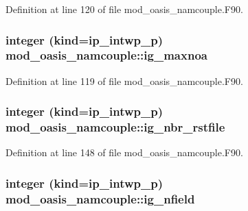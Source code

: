 Definition at line 120 of file mod\+\_\+oasis\+\_\+namcouple.\+F90.

\hypertarget{classmod__oasis__namcouple_ae66cf9f63b6c440406c9b675caef7759}{
\subsubsection[{ig\+\_\+maxnoa}]{\setlength{\rightskip}{0pt plus 5cm}integer (kind=ip\+\_\+intwp\+\_\+p) mod\+\_\+oasis\+\_\+namcouple\+::ig\+\_\+maxnoa\hspace{0.3cm}{\ttfamily [private]}}}\label{classmod__oasis__namcouple_ae66cf9f63b6c440406c9b675caef7759}


Definition at line 119 of file mod\+\_\+oasis\+\_\+namcouple.\+F90.

\hypertarget{classmod__oasis__namcouple_a05148b30ca97c536b40a896153c8921f}{
\subsubsection[{ig\+\_\+nbr\+\_\+rstfile}]{\setlength{\rightskip}{0pt plus 5cm}integer (kind=ip\+\_\+intwp\+\_\+p) mod\+\_\+oasis\+\_\+namcouple\+::ig\+\_\+nbr\+\_\+rstfile\hspace{0.3cm}{\ttfamily [private]}}}\label{classmod__oasis__namcouple_a05148b30ca97c536b40a896153c8921f}


Definition at line 148 of file mod\+\_\+oasis\+\_\+namcouple.\+F90.

\hypertarget{classmod__oasis__namcouple_a674f201daa7f2e1ba4c71221bda91d9c}{
\subsubsection[{ig\+\_\+nfield}]{\setlength{\rightskip}{0pt plus 5cm}integer (kind=ip\+\_\+intwp\+\_\+p) mod\+\_\+oasis\+\_\+namcouple\+::ig\+\_\+nfield\hspace{0.3cm}{\ttfamily [private]}}}\label{classmod__oasis__namcouple_a674f201daa7f2e1ba4c71221bda91d9c}


